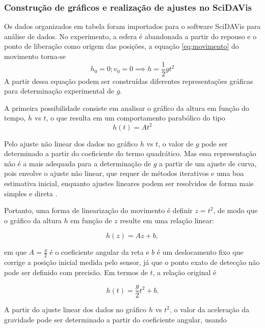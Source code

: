\documentclass[12pt,a4paper]{article}
\begin{document}
\subsubsection{Construção de gráficos e realização de ajustes no SciDAVis}
Os dados organizados em tabela foram importados para o software SciDAVis para análise de dados. No experimento, a esfera é abandonada a partir do repouso e  o ponto de liberação como origem das posições, a equação \eqref{eq:movimento} do movimento torna-se
\begin{equation}
h_0 = 0; v_0 = 0 \implies h = \frac{1}{2} g t^2
\end{equation}
A partir dessa equação podem ser construídas diferentes representações gráficas para determinação experimental de $g$.

A primeira possibilidade consiste em analisar o gráfico da altura em função do tempo, $h$ vs $t$, o que resulta em um comportamento parabólico do tipo
\begin{equation*}
h(t) = A t^2
\end{equation*}

Pelo ajuste não linear dos dados no gráfico $h$ vs $t$, o valor de $g$ pode ser determinado a partir do coeficiente do termo quadrático. Mas essa representação não é a mais adequada para a determinação de $g$ a partir de um ajuste de curva, pois envolve o ajuste não linear, que requer de métodos iterativos e uma boa estimativa inicial, enquanto ajustes lineares podem ser resolvidos de forma mais simples e direta \citep{bevington2003data}.

Portanto, uma forma de linearização do movimento é definir \(z = t^2\), de modo que o gráfico da altura \(h\) em função de \(z\) resulte em uma relação linear:

\begin{equation*}
h(z) = A z + b,
\end{equation*}

em que \(A = \frac{g}{2}\) é o coeficiente angular da reta e \(b\) é um deslocamento fixo que corrige a posição inicial medida pelo sensor, já que o ponto exato de detecção não pode ser definido com precisão. Em termos de \(t\), a relação original é

\begin{equation}
h(t) = \frac{g}{2} t^2 + b.
\label{eq:linearized_with_t2}
\end{equation}

A partir do ajuste linear dos dados no gráfico \(h\) vs \(t^2\), o valor da aceleração da gravidade pode ser determinado a partir do coeficiente angular, usando
\end{document}
